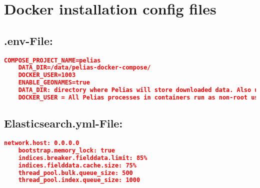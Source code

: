 \section{Docker installation config files} \label{Dicf}
\subsection{.env-File:}
\begin{lstlisting}[language=json,breaklines=true]
	COMPOSE_PROJECT_NAME=pelias 
	DATA_DIR=/data/pelias-docker-compose/ 
	DOCKER_USER=1003 
	ENABLE_GEONAMES=true
	DATA_DIR: directory where Pelias will store downloaded data. Also used to build its other services. 
	DOCKER_USER = All Pelias processes in containers run as non-root users. This user ID will be used for accessing files on the host filesystem in DATA_DIR.
\end{lstlisting}

\subsection{Elasticsearch.yml-File:}
\begin{lstlisting}[language=json,breaklines=true]
	network.host: 0.0.0.0 
	bootstrap.memory_lock: true 
	indices.breaker.fielddata.limit: 85% 
	indices.fielddata.cache.size: 75% 
	thread_pool.bulk.queue_size: 500 
	thread_pool.index.queue_size: 1000
\end{lstlisting}

